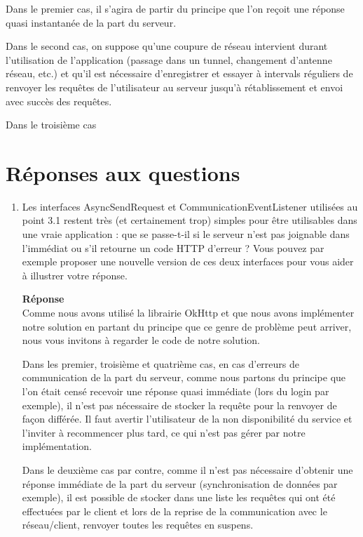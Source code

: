 \documentclass[a4paper]{article}
\begin{document}
Dans le premier cas, il s'agira de partir du principe que l'on reçoit une réponse quasi instantanée de la part du serveur.

Dans le second cas, on suppose qu'une coupure de réseau intervient durant l'utilisation de l'application (passage dans un tunnel, changement d'antenne réseau, etc.) et qu'il est nécessaire d'enregistrer et essayer à intervals réguliers de renvoyer les requêtes de l'utilisateur au serveur jusqu'à rétablissement et envoi avec succès des requêtes.

Dans le troisième cas 

\section{Réponses aux questions}

\begin{enumerate}
	\item Les interfaces AsyncSendRequest et CommunicationEventListener utilisées au point 3.1 restent très (et certainement trop) simples pour être utilisables dans une vraie application : que se passe-t-il si le serveur n’est pas joignable dans l’immédiat ou s’il retourne un code HTTP d’erreur ? Vous pouvez par exemple proposer une nouvelle version de ces deux interfaces pour vous aider à illustrer votre réponse.
    
    \textbf{Réponse} \\
    Comme nous avons utilisé la librairie OkHttp et que nous avons implémenter notre solution en partant du principe que ce genre de problème peut arriver, nous vous invitons à regarder le code de notre solution.
    
    Dans les premier, troisième et quatrième cas, en cas d'erreurs de communication de la part du serveur, comme nous partons du principe que l'on était censé recevoir une réponse quasi immédiate (lors du login par exemple), il n'est pas nécessaire de stocker la requête pour la renvoyer de façon différée. Il faut avertir l'utilisateur de la non disponibilité du service et l'inviter à recommencer plus tard, ce qui n'est pas gérer par notre implémentation.
    
    Dans le deuxième cas par contre, comme il n'est pas nécessaire d'obtenir une réponse immédiate de la part du serveur (synchronisation de données par exemple), il est possible de stocker dans une liste les requêtes qui ont été effectuées par le client et lors de la reprise de la communication avec le réseau/client, renvoyer toutes les requêtes en suspens.
	

\end{enumerate}
\end{document}
